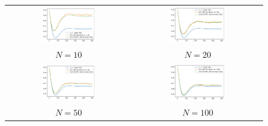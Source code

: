 \documentclass{elsarticle}
\begin{document}
\begin{figure}[ht]
  \begin{tabular}{cc}
    \includegraphics[width=0.45\textwidth]{SEIR_all_N10}
    &\includegraphics[width=0.45\textwidth]{SEIR_all_N20}\\
    $N=10$&$N=20$\\
    \includegraphics[width=0.45\textwidth]{SEIR_all_N50}
    &\includegraphics[width=0.45\textwidth]{SEIR_all_N100}\\
    $N=50$&$N=100$
  \end{tabular}

\end{figure}
\end{document}
